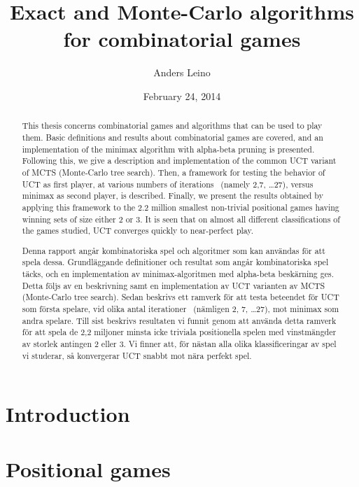 \documentclass[12pt]{article}
\begin{document}
\title{Exact and Monte-Carlo algorithms for combinatorial games}
\date{February 24, 2014}
\author{Anders Leino}
\maketitle
\begin{abstract}
This thesis concerns combinatorial games and algorithms that can be used to play them.
Basic definitions and results about combinatorial games are covered, and an implementation of the minimax algorithm with alpha-beta pruning is presented.
Following this, we give a description and implementation of the common UCT variant of MCTS (Monte-Carlo tree search).
Then, a framework for testing the behavior of UCT as first player, at various numbers of iterations ~(namely 2,7, \dots 27), versus minimax as second player, is described.
Finally, we present the results obtained by applying this framework to the 2.2 million smallest non-trivial positional games having winning sets of size either 2 or 3.
It is seen that on almost all different classifications of the games studied, UCT converges quickly to near-perfect play.
\end{abstract}
\pagebreak
\renewcommand{\abstractname}{Exakta och Monte-Carlo algoritmer för kombinatoriska spel}
\begin{abstract}
Denna rapport angår kombinatoriska spel och algoritmer som kan användas för att spela dessa.
Grundläggande definitioner och resultat som angår kombinatoriska spel täcks, och en implementation av minimax-algoritmen med alpha-beta beskärning ges.
Detta följs av en beskrivning samt en implementation av UCT varianten av MCTS (Monte-Carlo tree search).
Sedan beskrivs ett ramverk för att testa beteendet för UCT som första spelare, vid olika antal iterationer ~(nämligen 2, 7, \dots 27), mot minimax som andra spelare.
Till sist beskrivs resultaten vi funnit genom att använda detta ramverk för att spela de 2,2 miljoner minsta icke triviala positionella spelen med vinstmängder av storlek antingen 2 eller 3.
Vi finner att, för nästan alla olika klassificeringar av spel vi studerar, så konvergerar UCT snabbt mot nära perfekt spel.
\end{abstract}
\pagebreak
\tableofcontents
\pagebreak
\section{Introduction}
\label{sec:introduction}


\section{Positional games}
\label{sec:positional_games}

\end{document}
